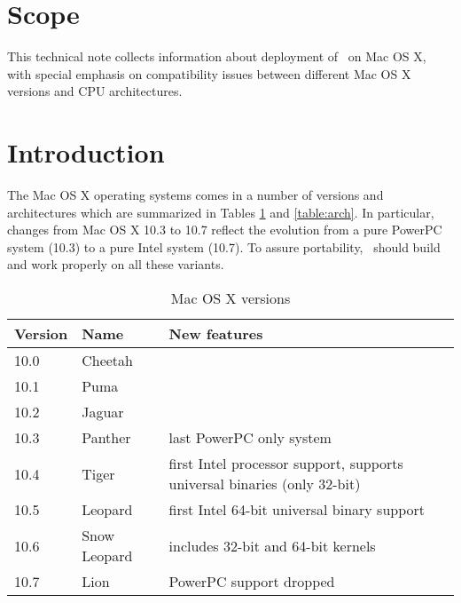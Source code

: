 \documentclass{article}[12pt,a4]
\begin{document}
\frontpage


\section{Scope}

This technical note collects information about deployment of \this\ on Mac OS X, with
special emphasis on compatibility issues between different Mac OS X versions and 
CPU architectures.


\section{Introduction}

The Mac OS X operating systems comes in a number of versions and architectures which are
summarized in Tables \ref{table:versions} and \ref{table:arch}.
In particular, changes from Mac OS X 10.3 to 10.7 reflect the evolution from a pure PowerPC
system (10.3) to a pure Intel system (10.7).
To assure portability, \task\ should build and work properly on all these variants.

\begin{table}[!h]
  \center
  \begin{tabular}{lll}
  \hline
  Version & Name & New features \\
  \hline
  10.0 & Cheetah & \\
  10.1 & Puma & \\
  10.2 & Jaguar & \\
  10.3 & Panther & last PowerPC only system \\
  10.4 & Tiger & first Intel processor support, supports universal binaries (only 32-bit) \\
  10.5 & Leopard & first Intel 64-bit universal binary support \\
  10.6 & Snow Leopard & includes 32-bit and 64-bit kernels \\
  10.7 & Lion & PowerPC support dropped \\
  \hline
  \end{tabular}
  \caption{Mac OS X versions}
  \label{table:versions}
\end{table}
\end{document}
